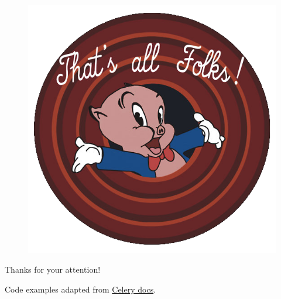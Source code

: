 \documentclass[xcolor=x11names,compress,t]{beamer}
\renewcommand{\(}{\begin{columns}[T]}
\renewcommand{\)}{\end{columns}}
\newcommand{\<}[1]{\begin{column}{#1}}
\renewcommand{\>}{\end{column}}
\newenvironment{slide}[1]{\subsection{#1} \begin{frame}{#1}}{\end{frame}}
\begin{document}
\begin{slide}{}
\begin{figure}
    \includegraphics[height=0.7\textheight]{porkey}
\end{figure}

\vspace{-1em}
\centering
\Large{Thanks for your attention!}
\vspace{1em}

\footnotesize{Code examples adapted from \href{http://celery.readthedocs.io}{Celery docs}.}
\end{slide}
\end{document}
